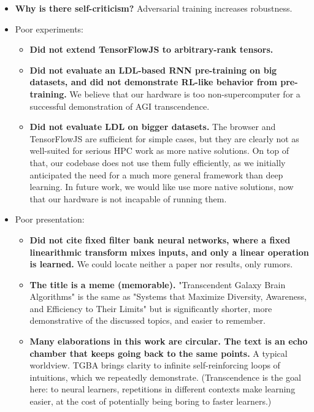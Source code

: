 \documentclass{article}
\begin{document}
\begin{itemize}
\item \textbf{Why is there self-criticism?} Adversarial training increases robustness.
\item Poor experiments:
\begin{itemize}
\item \textbf{Did not extend TensorFlowJS to arbitrary-rank tensors.}
\item \textbf{Did not evaluate an LDL-based RNN pre-training on big datasets, and did not demonstrate RL-like behavior from pre-training.} We believe that our hardware is too non-supercomputer for a successful demonstration of AGI transcendence.
\item \textbf{Did not evaluate LDL on bigger datasets.} The browser and TensorFlowJS are sufficient for simple cases, but they are clearly not as well-suited for serious HPC work as more native solutions. On top of that, our codebase does not use them fully efficiently, as we initially anticipated the need for a much more general framework than deep learning. In future work, we would like use more native solutions, now that our hardware is not incapable of running them.
\end{itemize}
\item Poor presentation:
\begin{itemize}
\item \textbf{Did not cite fixed filter bank neural networks, where a fixed linearithmic transform mixes inputs, and only a linear operation is learned.} We could locate neither a paper nor results, only rumors.
\item \textbf{The title is a meme (memorable).} "Transcendent Galaxy Brain Algorithms" is the same as "Systems that Maximize Diversity, Awareness, and Efficiency to Their Limits" but is significantly shorter, more demonstrative of the discussed topics, and easier to remember.
\item \textbf{Many elaborations in this work are circular. The text is an echo chamber that keeps going back to the same points.} A typical worldview. %
TGBA brings clarity to infinite self-reinforcing loops of intuitions, which we repeatedly demonstrate. (Transcendence is the goal here: to neural learners, repetitions in different contexts make learning easier, at the cost of potentially being boring to faster learners.)

\end{itemize}
\end{itemize}
\end{document}
